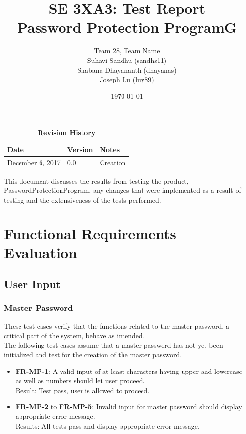 \documentclass[12pt, titlepage]{article}
\title{SE 3XA3: Test Report\\Password Protection ProgramG}
\author{Team 28, Team Name
		\\ Suhavi Sandhu (sandhs11)
		\\ Shabana Dhayananth (dhayanas)
		\\ Joseph Lu (luy89)
}
\date{\today}
\begin{document}
\maketitle

\tableofcontents
\listoftables

\begin{table}[bp]
\caption{\bf Revision History}
\begin{tabularx}{\textwidth}{p{3cm}p{2cm}X}
\toprule {\bf Date} & {\bf Version} & {\bf Notes}\\
\midrule
December 6, 2017 & 0.0 & Creation\\
\bottomrule
\end{tabularx}
\end{table}

\newpage


This document discusses the results from testing the product, PasswordProtectionProgram, any changes that were implemented as a result of testing and the extensiveness of the tests performed.

\section{Functional Requirements Evaluation}

	\subsection{User Input}
	
		\subsubsection{Master Password}
			These test cases verify that the functions related to the master password, a critical part of the system, behave as intended.\\
			
			The following test cases assume that a master password has not yet been initialized and test for the creation of the master password.
			
			\begin{itemize}
			
				\item \textbf{FR-MP-1}: A valid input of at least characters having upper and lowercase as well as numbers should let user proceed.\\
				 Result: Test pass, user is allowed to proceed.
				 
				\item \textbf{FR-MP-2} to \textbf{FR-MP-5}: Invalid input for master password should display appropriate error message.\\
				 Results: All tests pass and display appropriate error message.
			
			\end{itemize}
			 
\end{document}
